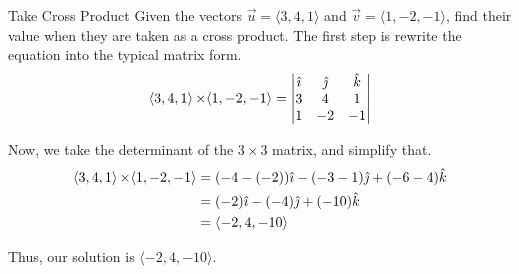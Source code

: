 \begin{example}[Lecture 4]{Take Cross Product}
  Given the vectors $\vec{u} = \langle 3, 4, 1 \rangle$ and $\vec{v} = \langle 1, -2, -1 \rangle$, find their value when they are taken as a cross product.
  \tcblower{}
  The first step is rewrite the  equation into the typical matrix form.
  \begin{equation*}
    \langle 3, 4, 1 \rangle \operatorname{\times} \langle 1, -2, -1 \rangle =
    \begin{vmatrix}
      \hat{\imath} & \hat{\jmath} & \hat{k} \\
      3 & 4 & 1 \\
      1 & -2 & -1
    \end{vmatrix}
  \end{equation*}

  Now, we take the determinant of the $3 \times 3$ matrix, and simplify that.
  \begin{align*}
    \langle 3, 4, 1 \rangle \operatorname{\times} \langle 1, -2, -1 \rangle &= (-4 - (-2))\hat{\imath} - (-3 - 1)\hat{\jmath} + (-6 - 4) \hat{k} \\
                                                             &= (-2)\hat{\imath} - (-4)\hat{\jmath} + (-10)\hat{k} \\
                                                             &= \langle -2, 4, -10 \rangle
  \end{align*}

  Thus, our solution is $\langle -2, 4, -10 \rangle$.
\end{example}


